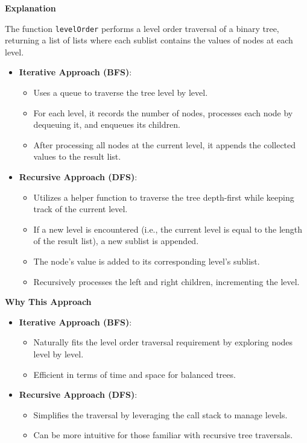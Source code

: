 \textbf{Explanation}

The function \texttt{levelOrder} performs a level order traversal of a binary tree, returning a list of lists where each sublist contains the values of nodes at each level. 

\begin{itemize}
    \item \textbf{Iterative Approach (BFS)}:
    \begin{itemize}
        \item Uses a queue to traverse the tree level by level.
        \item For each level, it records the number of nodes, processes each node by dequeuing it, and enqueues its children.
        \item After processing all nodes at the current level, it appends the collected values to the result list.
    \end{itemize}
    
    \item \textbf{Recursive Approach (DFS)}:
    \begin{itemize}
        \item Utilizes a helper function to traverse the tree depth-first while keeping track of the current level.
        \item If a new level is encountered (i.e., the current level is equal to the length of the result list), a new sublist is appended.
        \item The node's value is added to its corresponding level's sublist.
        \item Recursively processes the left and right children, incrementing the level.
    \end{itemize}
\end{itemize}

\textbf{Why This Approach}

\begin{itemize}
    \item \textbf{Iterative Approach (BFS)}: 
    \begin{itemize}
        \item Naturally fits the level order traversal requirement by exploring nodes level by level.
        \item Efficient in terms of time and space for balanced trees.
    \end{itemize}
    
    \item \textbf{Recursive Approach (DFS)}: 
    \begin{itemize}
        \item Simplifies the traversal by leveraging the call stack to manage levels.
        \item Can be more intuitive for those familiar with recursive tree traversals.
    \end{itemize}
\end{itemize}

